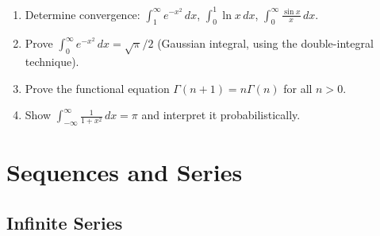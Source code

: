 \documentclass[12pt, openany]{book}
\theoremstyle{plain}
\theoremstyle{definition}
\theoremstyle{remark}
\begin{document}
\begin{exbox}
\begin{enumerate}
  \item Determine convergence: $\int_1^\infty e^{-x^2}\,dx$, $\int_0^1 \ln x\,dx$, $\int_0^\infty \frac{\sin x}{x}\,dx$.
  \item Prove $\int_0^\infty e^{-x^2}\,dx = \sqrt{\pi}/2$ (Gaussian integral, using the double-integral technique).
  \item Prove the functional equation $\Gamma(n+1) = n\Gamma(n)$ for all $n > 0$.
  \item Show $\int_{-\infty}^\infty \frac{1}{1+x^2}\,dx = \pi$ and interpret it probabilistically.
\end{enumerate}
\end{exbox}
\color{black}

\part{Sequences and Series}
\color{black}

\chapter{Infinite Series}
\color{black}
\end{document}
